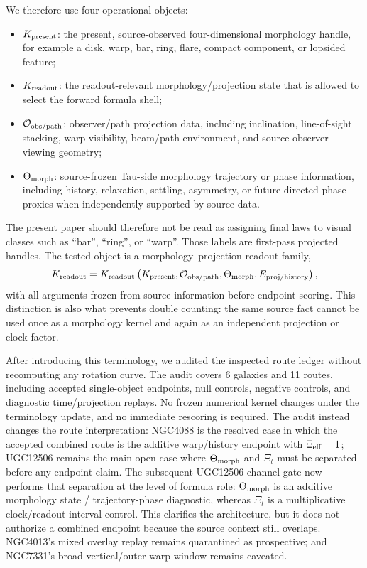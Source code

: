 \documentclass[11pt]{article}
\begin{document}
We therefore use four operational objects:
\begin{itemize}[leftmargin=1.5em]
  \item \(K_{\rm present}\): the present, source-observed four-dimensional
  morphology handle, for example a disk, warp, bar, ring, flare, compact
  component, or lopsided feature;
  \item \(K_{\rm readout}\): the readout-relevant morphology/projection state
  that is allowed to select the forward formula shell;
  \item \({\cal O}_{\rm obs/path}\): observer/path projection data, including
  inclination, line-of-sight stacking, warp visibility, beam/path environment,
  and source-observer viewing geometry;
  \item \(\Theta_{\rm morph}\): source-frozen Tau-side morphology trajectory or
  phase information, including history, relaxation, settling, asymmetry, or
  future-directed phase proxies when independently supported by source data.
\end{itemize}

The present paper should therefore not be read as assigning final laws to
visual classes such as ``bar'', ``ring'', or ``warp''.  Those labels are
first-pass projected handles.  The tested object is a
morphology--projection readout family,
\[
  K_{\rm readout}
  =
  K_{\rm readout}
  \left(
    K_{\rm present},
    {\cal O}_{\rm obs/path},
    \Theta_{\rm morph},
    E_{\rm proj/history}
  \right),
\]
with all arguments frozen from source information before endpoint scoring.
This distinction is also what prevents double counting: the same source fact
cannot be used once as a morphology kernel and again as an independent
projection or clock factor.

After introducing this terminology, we audited the inspected route ledger
without recomputing any rotation curve.  The audit covers 6 galaxies and 11
routes, including accepted single-object endpoints, null controls, negative
controls, and diagnostic time/projection replays.  No frozen numerical kernel
changes under the terminology update, and no immediate rescoring is required.
The audit instead changes the route interpretation: NGC4088 is the resolved
case in which the accepted combined route is the additive warp/history endpoint
with \(\Xi_{\rm eff}=1\); UGC12506 remains the main open case where
\(\Theta_{\rm morph}\) and \(\Xi_t\) must be separated before any endpoint
claim.  The subsequent UGC12506 channel gate now performs that separation at
the level of formula role: \(\Theta_{\rm morph}\) is an additive morphology
state / trajectory-phase diagnostic, whereas \(\Xi_t\) is a multiplicative
clock/readout interval-control.  This clarifies the architecture, but it does
not authorize a combined endpoint because the source context still overlaps.
NGC4013's mixed overlay replay remains quarantined as prospective; and
NGC7331's broad vertical/outer-warp window remains caveated.
\end{document}
